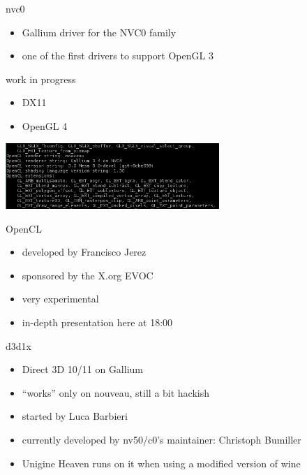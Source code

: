 \documentclass[11pt,english,compress]{beamer}
\begin{document}
		\begin{frame}
			\begin{block}{nvc0}
				\begin{itemize}
					\item Gallium driver for the NVC0 family
					\item one of the first drivers to support OpenGL 3
				\end{itemize}
			\end{block}
			\begin{block}{work in progress}
				\begin{itemize}
					\item DX11
					\item OpenGL 4
				\end{itemize}
			\end{block}

			\begin{center}
				\includegraphics[height=2.5cm]{imgs/opengl3.png}
			\end{center}
		\end{frame}
		\begin{frame}
			\begin{block}{OpenCL}
				\begin{itemize}
					\item developed by Francisco Jerez
					\item sponsored by the X.org EVOC
					\item very experimental
					\item in-depth presentation here at 18:00
				\end{itemize}
			\end{block}

			\begin{block}{d3d1x}
				\begin{itemize}
					\item Direct 3D 10/11 on Gallium
					\item ``works'' only on nouveau, still a bit hackish
					\item started by Luca Barbieri
					\item currently developed by nv50/c0's maintainer: Christoph Bumiller
					\item Unigine Heaven runs on it when using a modified version of wine
				\end{itemize}
			\end{block}
		\end{frame}
\end{document}
